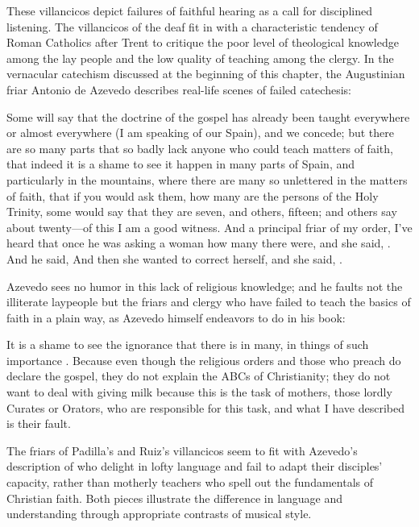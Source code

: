 These villancicos depict failures of faithful hearing as a call for disciplined
listening.
The villancicos of the deaf fit in with a characteristic tendency of Roman
Catholics after Trent to critique the poor level of theological knowledge among
the lay people and the low quality of teaching among the clergy.%
    \Autocite[56--57]{Kamen:EarlyModernSociety}
In the vernacular catechism discussed at the beginning of this chapter, the
Augustinian friar Antonio de Azevedo describes real-life scenes of failed
catechesis: 
\begin{quoting}
    Some will say that the doctrine of the gospel has already been taught
    everywhere or almost everywhere (I am speaking of our Spain), and we
    concede; but there are so many parts that so badly lack anyone who could
    teach matters of faith, that indeed it is a shame to see it happen in many
    parts of Spain, and particularly in the mountains, where there are many so
    unlettered  in the matters of faith, that if you would ask
    them, how many are the persons of the Holy Trinity, some would say that they
    are seven, and others, fifteen; and others say about twenty---of this I am a
    good witness.
    And a principal friar of my order, I've heard that once he was asking a
    woman how many  there were, and she said,
    . 
    And he said,  
    And then she wanted to correct herself, and she said, .%
        \Autocite[26]{Azevedo:Catecismo}
\end{quoting}
Azevedo sees no humor in this lack of religious knowledge; and he faults not the
illiterate laypeople but the friars and clergy who have failed to teach the
basics of faith in a plain way, as Azevedo himself endeavors to do in his book:
\begin{quoting}
    It is a shame to see the ignorance that there is in many, in things of such
    importance \Dots{}.
    Because even though the religious orders and those who preach do declare the
    gospel, they do not explain the ABCs  of Christianity;
    they do not want to deal with giving milk because this is the task of
    mothers, those lordly Curates or Orators, who are responsible for this task,
    and what I have described is their fault.%
        \Autocite[27]{Azevedo:Catecismo}
\end{quoting}
The friars of Padilla's and Ruiz's villancicos seem to fit with Azevedo's
description of  who delight in lofty language and fail to
adapt their disciples' capacity, rather than motherly teachers who spell out the
fundamentals of Christian faith.
Both pieces illustrate the difference in language and understanding through
appropriate contrasts of musical style.

